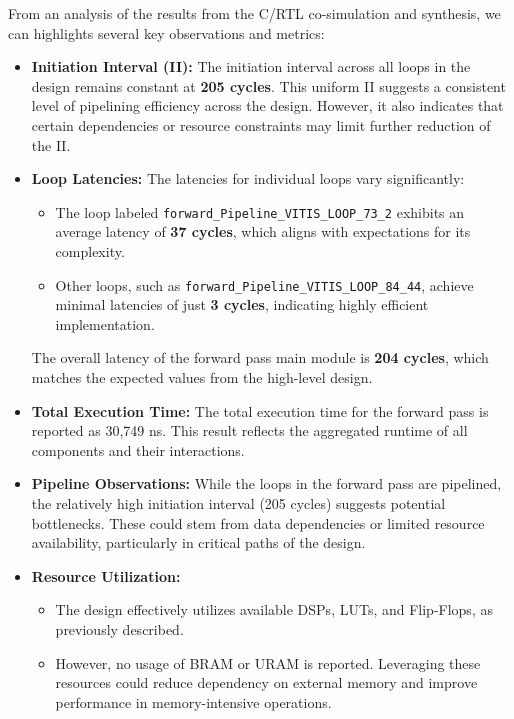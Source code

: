 \documentclass{article}
\begin{document}
From an analysis of the results from the C/RTL co-simulation and synthesis, we can highlights several key observations and metrics:

\begin{itemize}
    \item \textbf{Initiation Interval (II):} The initiation interval across all loops in the design remains constant at \textbf{205 cycles}. This uniform II suggests a consistent level of pipelining efficiency across the design. However, it also indicates that certain dependencies or resource constraints may limit further reduction of the II.

    \item \textbf{Loop Latencies:} The latencies for individual loops vary significantly:
    \begin{itemize}
        \item The loop labeled \texttt{forward\_Pipeline\_VITIS\_LOOP\_73\_2} exhibits an average latency of \textbf{37 cycles}, which aligns with expectations for its complexity.
        \item Other loops, such as \texttt{forward\_Pipeline\_VITIS\_LOOP\_84\_44}, achieve minimal latencies of just \textbf{3 cycles}, indicating highly efficient implementation.
    \end{itemize}
    The overall latency of the forward pass main module is \textbf{204 cycles}, which matches the expected values from the high-level design.

    \item \textbf{Total Execution Time:} The total execution time for the forward pass is reported as 30,749 ns. This result reflects the aggregated runtime of all components and their interactions.

    \item \textbf{Pipeline Observations:} While the loops in the forward pass are pipelined, the relatively high initiation interval (205 cycles) suggests potential bottlenecks. These could stem from data dependencies or limited resource availability, particularly in critical paths of the design.

    \item \textbf{Resource Utilization:} 
    \begin{itemize}
        \item The design effectively utilizes available DSPs, LUTs, and Flip-Flops, as previously described.
        \item However, no usage of BRAM or URAM is reported. Leveraging these resources could reduce dependency on external memory and improve performance in memory-intensive operations.
    \end{itemize}
\end{itemize}
\end{document}
